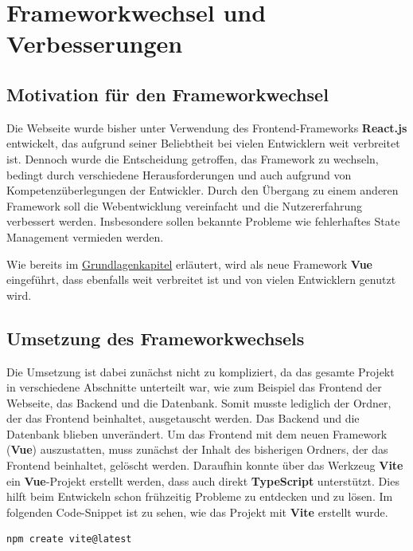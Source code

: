 \section{Frameworkwechsel und Verbesserungen}

\subsection{Motivation für den Frameworkwechsel}

Die Webseite wurde bisher unter Verwendung des Frontend-Frameworks \textbf{React.js} entwickelt, das aufgrund seiner Beliebtheit bei vielen Entwicklern weit verbreitet ist.
Dennoch wurde die Entscheidung getroffen, das Framework zu wechseln, bedingt durch verschiedene Herausforderungen und auch aufgrund von Kompetenzüberlegungen der Entwickler.
Durch den Übergang zu einem anderen Framework soll die Webentwicklung vereinfacht und die Nutzererfahrung verbessert werden.
Insbesondere sollen bekannte Probleme wie fehlerhaftes State Management vermieden werden.

Wie bereits im \hyperref[chapter:3-frontend-frameworks]{Grundlagenkapitel} erläutert, wird als neue Framework \textbf{Vue} eingeführt, dass ebenfalls weit verbreitet ist und von vielen Entwicklern genutzt wird.

\subsection{Umsetzung des Frameworkwechsels}

Die Umsetzung ist dabei zunächst nicht zu kompliziert, da das gesamte Projekt in verschiedene Abschnitte unterteilt war, wie zum Beispiel das Frontend der Webseite, das Backend und die Datenbank.
Somit musste lediglich der Ordner, der das Frontend beinhaltet, ausgetauscht werden.
Das Backend und die Datenbank blieben unverändert.
Um das Frontend mit dem neuen Framework (\textbf{Vue}) auszustatten, muss zunächst der Inhalt des bisherigen Ordners, der das Frontend beinhaltet, gelöscht werden.
Daraufhin konnte über das Werkzeug \textbf{Vite} ein \textbf{Vue}-Projekt erstellt werden, dass auch direkt \textbf{TypeScript} unterstützt.
Dies hilft beim Entwickeln schon frühzeitig Probleme zu entdecken und zu lösen.
Im folgenden Code-Snippet ist zu sehen, wie das Projekt mit \textbf{Vite} erstellt wurde.

\begin{lstlisting}[language={bash}, caption={Initialisierung des Vue Projektes mit Vite \cite{vitejs-getting-started}}]
npm create vite@latest
\end{lstlisting}

